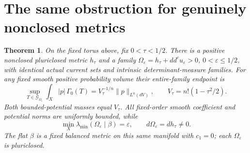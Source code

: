 \documentclass[11pt]{article}
\newcommand{\ddc}{dd^c}
\newcommand{\Ga}{\mathcal G}
\newtheorem{theorem}{Theorem}
\theoremstyle{remark}\newtheorem{remark}[theorem]{Remark}
\begin{document}
\section{The same obstruction for genuinely nonclosed metrics}
\begin{theorem}\label{th:nonclosed}
On the fixed torus above, fix $0<\tau<1/2$. There is a positive
nonclosed pluriclosed metric $h_\tau$ and a family
$\Omega_\varepsilon=h_\tau+\ddc u_\varepsilon>0$,
$0<\varepsilon\leq1/2$, with identical actual current sets and
intrinsic determinant-measure families. For any fixed smooth positive
probability volume their entire-family endpoint is
\[
 \sup_{T\in\Ga_{\Omega_\varepsilon}}
       \int_X|p|\,\Gamma_0(T)
       =V_\tau^{-1/n}\|p\|_{L^n(dV)},\qquad
 V_\tau=n!(1-\tau^2/2).
\]
Both bounded-potential masses equal $V_\tau$. All fixed-order smooth
coefficient and potential norms are uniformly bounded, while
\[
 \min_X\lambda_{\min}(\Omega_\varepsilon\mid\beta)=\varepsilon,
 \qquad d\Omega_\varepsilon=dh_\tau\ne0.
\]
The flat $\beta$ is a fixed balanced metric on this same manifold
with $c_1=0$; each $\Omega_\varepsilon$ is pluriclosed.
\end{theorem}
\end{document}
